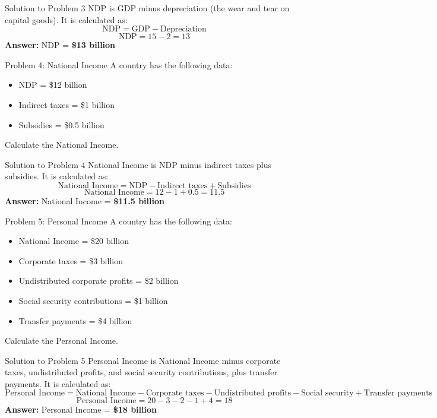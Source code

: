 \documentclass{beamer}
\begin{document}
\begin{frame}{Solution to Problem 3}
NDP is GDP minus depreciation (the wear and tear on capital goods). It is calculated as:
\[
\text{NDP} = \text{GDP} - \text{Depreciation}
\]
\[
\text{NDP} = 15 - 2 = 13
\]
\textbf{Answer:} NDP = \textbf{\$13 billion}
\end{frame}

\begin{frame}{Problem 4: National Income}
A country has the following data:
\begin{itemize}
    \item NDP = \$12 billion
    \item Indirect taxes = \$1 billion
    \item Subsidies = \$0.5 billion
\end{itemize}
Calculate the National Income.
\end{frame}

\begin{frame}{Solution to Problem 4}
National Income is NDP minus indirect taxes plus subsidies. It is calculated as:
\[
\text{National Income} = \text{NDP} - \text{Indirect taxes} + \text{Subsidies}
\]
\[
\text{National Income} = 12 - 1 + 0.5 = 11.5
\]
\textbf{Answer:} National Income = \textbf{\$11.5 billion}
\end{frame}

\begin{frame}{Problem 5: Personal Income}
A country has the following data:
\begin{itemize}
    \item National Income = \$20 billion
    \item Corporate taxes = \$3 billion
    \item Undistributed corporate profits = \$2 billion
    \item Social security contributions = \$1 billion
    \item Transfer payments = \$4 billion
\end{itemize}
Calculate the Personal Income.
\end{frame}

\begin{frame}{Solution to Problem 5}
Personal Income is National Income minus corporate taxes, undistributed profits, and social security contributions, plus transfer payments. It is calculated as:
\[
\text{Personal Income} = \text{National Income} - \text{Corporate taxes} - \text{Undistributed profits} - \text{Social security} + \text{Transfer payments}
\]
\[
\text{Personal Income} = 20 - 3 - 2 - 1 + 4 = 18
\]
\textbf{Answer:} Personal Income = \textbf{\$18 billion}
\end{frame}
\end{document}
